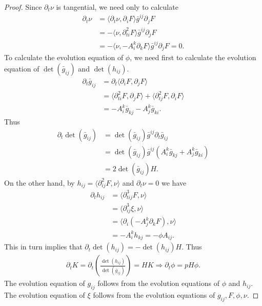 \documentclass{amsart}
\theoremstyle{definition}
\theoremstyle{remark}
\numberwithin{equation}{section}
\begin{document}
\begin{proof}
Since $\partial_t \nu$ is tangential, we need only to calculate
\begin{align*}
\partial_t\nu&=\langle \partial_t\nu,\partial_iF\rangle \bar{g}^{ij}\partial_jF\\
&=-\langle \nu,\partial^2_{ti}F\rangle \bar{g}^{ij}\partial_jF\\
&=-\langle \nu,-A_i^k\partial_kF\rangle \bar{g}^{ij}\partial_jF=0.
\end{align*}
To calculate the evolution equation of $\phi$, we need first to calculate the evolution equation of $\det(\bar{g}_{ij})$ and $\det(h_{ij}).$
\begin{align*}
\partial_t \bar{g}_{ij}&=\partial_t \langle \partial_iF,\partial_jF\rangle\\
&=\langle \partial_{ti}^2F,\partial_jF\rangle+\langle \partial_{tj}^2F,\partial_iF\rangle\\
&=-A_{i}^k\bar{g}_{kj}-A_{j}^k\bar{g}_{ki}.
\end{align*}
Thus
\begin{align*}
\partial_t\det (\bar{g}_{ij})&=\det (\bar{g}_{ij})\bar{g}^{ij}\partial_t\bar{g}_{ij}\\
&=\det (\bar{g}_{ij})\bar{g}^{ij}
(A_{i}^k\bar{g}_{kj}+A_{j}^k\bar{g}_{ki})\\
&=2\det (\bar{g}_{ij})H.
\end{align*}
On the other hand, by $h_{ij}=\langle \partial_{ij}^2F, \nu\rangle$ and $\partial_t\nu=0$ we have
\begin{align*}
\partial_t h_{ij}&=\langle\partial^3_{tij}F,\nu\rangle\\
&=\langle\partial^3_{ij}\xi,\nu\rangle\\
&=\langle \partial_i(-A_j^k\partial_kF),\nu\rangle\\
&=-A_i^kh_{kj}=-\phi A_{ij}.
\end{align*}
This in turn implies that $\partial_t\det(h_{ij})=-\det(h_{ij})H.$
Thus
\begin{align*}
\partial_t K =\partial_t\left(\frac{\det(h_{ij})}{\det(\bar{g}_{ij})}\right)=H K \Rightarrow \partial_t \phi= p  H\phi.
\end{align*}
The evolution equation of $g_{ij}$ follows from the evolution equations of $\phi$ and $h_{ij}.$ The evolution equation of $\xi$ follows from the evolution equations of $g_{ij}, F, \phi,\nu.$ %

\end{proof}
\end{document}
